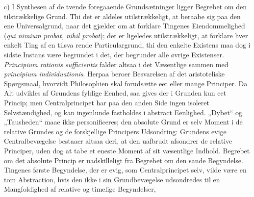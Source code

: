 \documentclass[12pt]{book}
\newcommand{\opage}[1]{\marginnote{\footnotesize\textit{[#1]}}}
\begin{document}
c) I Synthesen af de tvende foregaaende Grundsætninger ligger Begrebet om den
tilstrækkelige Grund. Thi det er aldeles utilstrækkeligt, at beraabe sig paa den ene
Universalgrund, naar det gjælder om at forklare Tingenes Eiendommelighed
(\textit{qui nimium probat, nihil probat}); det er ligeledes utilstrækkeligt, at
forklare hver enkelt Ting af en tilsva%
\opage{130}%
%
%
rende Particulargrund, thi den enkelte Existens maa dog i sidste Instans være
begrundet i det, der begrunder alle øvrige Existenser. \textit{Principium rationis
sufficientis} falder altsaa i det Væsentlige sammen med \textit{principium
individuationis}. Herpaa beroer Besvarelsen af det aristoteliske Spørgsmaal,
hvorvidt Philosophien skal forudsætte eet eller mange Principer. Da Alt udvikles af
Grundens fyldige Eenhed, saa gives der i Grunden kun eet Princip; men
Centralprincipet har paa den anden Side ingen isoleret Selvstændighed, og kan
ingenlunde fastholdes i abstract Eenlighed. „Dybet“ og „Tausheden“ maae ikke
personificeres; den absolute Grund er selv Moment i de relative Grundes og de
forskjellige Principers Udsondring: Grundens evige Centralbevægelse bestaaer altsaa
deri, at den uafbrudt afsondrer de relative Principer, uden dog at tabe et eneste
Moment af sit væsentlige Indhold. Begrebet om det absolute Princip er uadskilleligt
fra Begrebet om den sande Begyndelse. Tingenes første Begyndelse, der er evig, som
Centralprincipet selv, vilde være en tom Abstraction, hvis den ikke i sin
Grundbevægelse udsondredes til en Mangfoldighed af relative og timelige Begyndelser,
\end{document}
